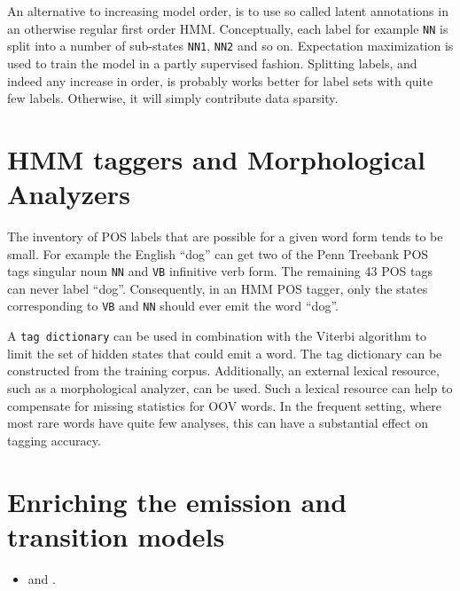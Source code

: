 An alternative to increasing model order, is to use so called latent
annotations \citep{Huang2009} in an otherwise regular first order
HMM. Conceptually, each label for example {\tt NN} is split into a
number of sub-states {\tt NN1}, {\tt NN2} and so on. Expectation
maximization is used to train the model in a partly supervised
fashion. Splitting labels, and indeed any increase in order, is
probably works better for label sets with quite few labels. Otherwise,
it will simply contribute data sparsity.


\section{HMM taggers and Morphological Analyzers}
\label{sec:hmm-label-dict}

The inventory of POS labels that are possible for a given word form
tends to be small. For example the English ``dog'' can get two of the
Penn Treebank POS tags singular noun {\tt NN} and {\tt VB} infinitive
verb form. The remaining 43 POS tags can never label
``dog''. Consequently, in an HMM POS tagger, only the states
corresponding to {\tt VB} and {\tt NN} should ever emit the word
``dog''.

A {\tt tag dictionary} \citep{Brants2000} can be used in combination
with the Viterbi algorithm to limit the set of hidden states that
could emit a word. The tag dictionary can be constructed from the
training corpus. Additionally, an external lexical resource, such as a
morphological analyzer, can be used. Such a lexical resource can help
to compensate for missing statistics for OOV words. In the frequent
setting, where most rare words have quite few analyses, this can have
a substantial effect on tagging accuracy.

\section{Enriching the emission and transition models}
\begin{itemize}
\item \cite{Halacsy2007} and \cite{Silfverberg2011}.
\end{itemize}

